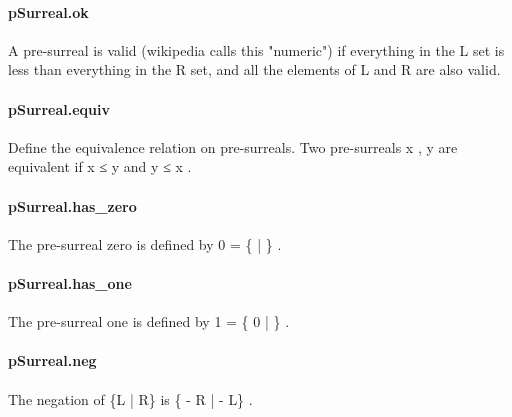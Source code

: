 \documentclass{article}
\begin{document}
\paragraph{pSurreal.ok}
\par
A pre-surreal is valid (wikipedia calls this "numeric") if
everything in the L set is less than everything in the R set,
and all the elements of L and R are also valid.
\paragraph{pSurreal.equiv}
\par
Define the equivalence relation on pre-surreals. Two pre-surreals
\colorbox[RGB]{253,246,227}{{{{\color[RGB]{101, 123, 131} x }}}}, 
\colorbox[RGB]{253,246,227}{{{{\color[RGB]{101, 123, 131} y }}}} are equivalent if 
\colorbox[RGB]{253,246,227}{{{{\color[RGB]{101, 123, 131} x  }}}{{{\color[RGB]{181, 137, 0} ≤ }}}{{{\color[RGB]{101, 123, 131}  y }}}} and 
\colorbox[RGB]{253,246,227}{{{{\color[RGB]{101, 123, 131} y  }}}{{{\color[RGB]{181, 137, 0} ≤ }}}{{{\color[RGB]{101, 123, 131}  x }}}}.
\paragraph{pSurreal.has\_zero}
\par
The pre-surreal zero is defined by 
\colorbox[RGB]{253,246,227}{{{{\color[RGB]{108, 113, 196} 0 }}}{{{\color[RGB]{101, 123, 131}   }}}{{{\color[RGB]{181, 137, 0} = }}}{{{\color[RGB]{101, 123, 131}  \{ | \} }}}}.
\paragraph{pSurreal.has\_one}
\par
The pre-surreal one is defined by 
\colorbox[RGB]{253,246,227}{{{{\color[RGB]{108, 113, 196} 1 }}}{{{\color[RGB]{101, 123, 131}   }}}{{{\color[RGB]{181, 137, 0} = }}}{{{\color[RGB]{101, 123, 131}  \{  }}}{{{\color[RGB]{108, 113, 196} 0 }}}{{{\color[RGB]{101, 123, 131}  | \} }}}}.
\paragraph{pSurreal.neg}
\par
The negation of 
\colorbox[RGB]{253,246,227}{{{{\color[RGB]{101, 123, 131} \{L | R\} }}}} is 
\colorbox[RGB]{253,246,227}{{{{\color[RGB]{101, 123, 131} \{ }}}{{{\color[RGB]{181, 137, 0} - }}}{{{\color[RGB]{101, 123, 131} R |  }}}{{{\color[RGB]{181, 137, 0} - }}}{{{\color[RGB]{101, 123, 131} L\} }}}}.
\end{document}
